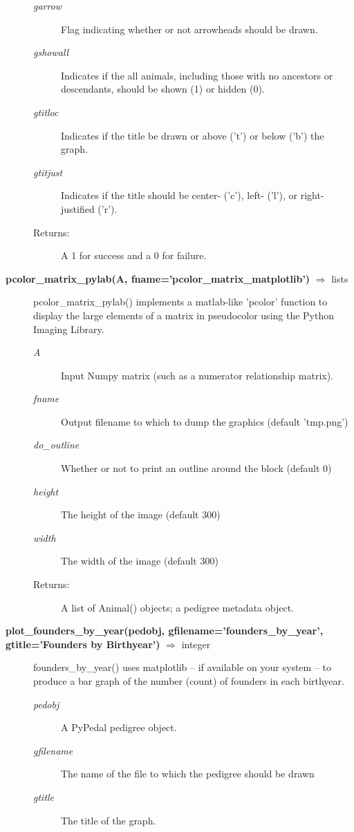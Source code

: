\begin{description}
\begin{description}
\item[\emph{garrow}] Flag indicating whether or not arrowheads should be drawn.
\item[\emph{gshowall}] Indicates if the all animals, including those with no ancestors or descendants, should be shown (1) or hidden (0).
\item[\emph{gtitloc}] Indicates if the title be drawn or above ('t') or below ('b') the graph.
\item[\emph{gtitjust}] Indicates if the title should be center- ('c'), left- ('l'), or right-justified ('r').
\item[Returns:] A 1 for success and a 0 for failure.
\end{description}
\item[\textbf{pcolor\_matrix\_pylab(A, fname='pcolor\_matrix\_matplotlib')} $\Rightarrow$ lists]
pcolor\_matrix\_pylab() implements a matlab-like 'pcolor' function to display the large elements of a matrix in pseudocolor using the Python Imaging Library.
\begin{description}
\item[\emph{A}] Input Numpy matrix (such as a numerator relationship matrix).
\item[\emph{fname}] Output filename to which to dump the graphics (default 'tmp.png')
\item[\emph{do\_outline}] Whether or not to print an outline around the block (default 0)
\item[\emph{height}] The height of the image (default 300)
\item[\emph{width}] The width of the image (default 300)
\item[Returns:] A list of Animal() objects; a pedigree metadata object.
\end{description}
\item[\textbf{plot\_founders\_by\_year(pedobj, gfilename='founders\_by\_year', gtitle='Founders by Birthyear')} $\Rightarrow$ integer]
founders\_by\_year() uses matplotlib -- if available on your system -- to produce a bar graph of the number (count) of founders in each birthyear.
\begin{description}
\item[\emph{pedobj}] A PyPedal pedigree object.
\item[\emph{gfilename}] The name of the file to which the pedigree should be drawn
\item[\emph{gtitle}] The title of the graph.

\end{description}
\end{description}

